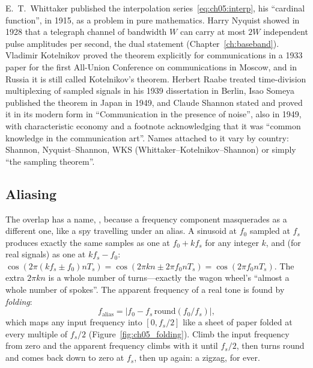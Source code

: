 \begin{history}
E.~T.~Whittaker published the interpolation series~\eqref{eq:ch05:interp}, his ``cardinal
function'', in 1915, as a problem in pure mathematics. Harry Nyquist showed in 1928 that a
telegraph channel of bandwidth $W$ can carry at most $2W$ independent pulse amplitudes per
second, the dual statement (Chapter~\ref{ch:baseband}). Vladimir Kotelnikov proved the theorem
explicitly for communications in a 1933 paper for the first All-Union Conference on
communications in Moscow, and in Russia it is still called Kotelnikov's theorem. Herbert Raabe
treated time-division multiplexing of sampled signals in his 1939 dissertation in Berlin, Isao
Someya published the theorem in Japan in 1949, and Claude Shannon stated and proved it in its
modern form in ``Communication in the presence of noise'', also in 1949, with characteristic
economy and a footnote acknowledging that it was ``common knowledge in the communication
art''. Names attached to it vary by country: Shannon, Nyquist--Shannon, WKS
(Whittaker--Kotelnikov--Shannon) or simply ``the sampling theorem''.
\end{history}

\subsection{Aliasing}

The overlap has a name, , because a frequency component masquerades as a
different one, like a spy travelling under an alias. A sinusoid at $f_0$ sampled at $f_s$
produces exactly the same samples as one at $f_0+kf_s$ for any integer $k$, and (for real signals)
as one at $kf_s-f_0$: $\cos(2\pi(kf_s\pm f_0)nT_s)=\cos(2\pi kn\pm2\pi f_0nT_s)=\cos(2\pi f_0nT_s)$.
The extra $2\pi kn$ is a whole number of turns---exactly the wagon wheel's ``almost a whole number
of spokes''. The apparent frequency of a real tone is found by \emph{folding}:
\begin{equation}
f_{\text{alias}}=\big|f_0-f_s\,\mathrm{round}(f_0/f_s)\big|,
\label{eq:ch05:fold}
\end{equation}
which maps any input frequency into $[0,f_s/2]$ like a sheet of paper folded at every multiple
of $f_s/2$ (Figure~\ref{fig:ch05_folding}). Climb the input frequency from zero and the apparent
frequency climbs with it until $f_s/2$, then turns round and comes back down to zero at $f_s$,
then up again: a zigzag, for ever.


